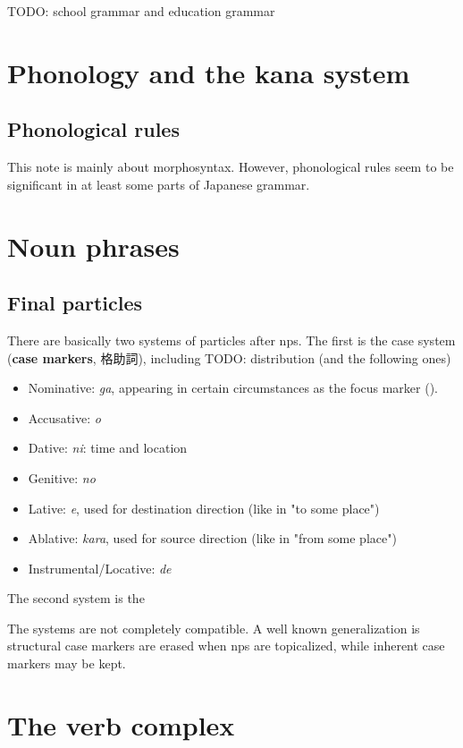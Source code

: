 \documentclass[UTF8, a4paper, oneside, scheme=plain]{ctexart}
\newcommand*{\concept}[1]{\textbf{#1}}
\newcommand{\corpus}[1]{\emph{#1}}
\begin{document}
TODO: school grammar and education grammar

\section{Phonology and the kana system}

\subsection{Phonological rules}

This note is mainly about morphosyntax.
However, phonological rules seem to be significant in at least some parts of Japanese grammar.


\section{Noun phrases}

\subsection{Final particles}

There are basically two systems of particles after \ac{np}s.
The first is the case system (\concept{case markers}, 格助詞), including
TODO: distribution (and the following ones)
\begin{itemize}
    \item Nominative: \corpus{ga}, 
    appearing in certain circumstances as the focus marker ().
    \item Accusative: \corpus{o}
    \item Dative: \corpus{ni}: time and location 
    \item Genitive: \corpus{no} 
    \item Lative: \corpus{e}, used for destination direction (like in "to some place")
    \item Ablative: \corpus{kara}, used for source direction (like in "from some place")
    \item Instrumental/Locative: \corpus{de}
\end{itemize}

The second system is the 

The systems are not completely compatible.
A well known generalization is structural case markers are erased when \ac{np}s are topicalized,
while inherent case markers may be kept.


\section{The verb complex}
\end{document}
